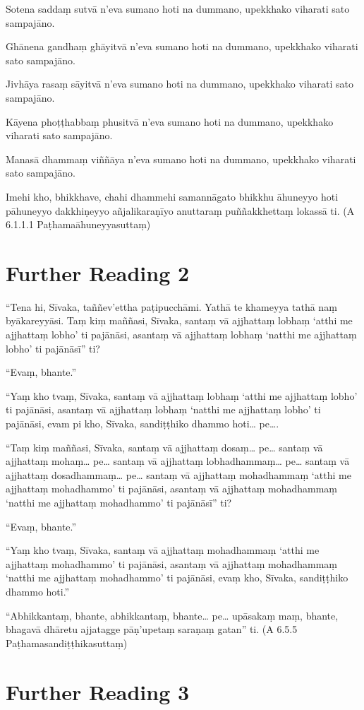 Sotena saddaṃ sutvā n’eva sumano hoti na dummano, upekkhako viharati sato sampajāno.

Ghānena gandhaṃ ghāyitvā n’eva sumano hoti na dummano, upekkhako viharati sato sampajāno.

Jivhāya rasaṃ sāyitvā n’eva sumano hoti na dummano, upekkhako viharati sato sampajāno.

Kāyena phoṭṭhabbaṃ phusitvā n’eva sumano hoti na dummano, upekkhako viharati sato sampajāno.

Manasā dhammaṃ viññāya n’eva sumano hoti na dummano, upekkhako viharati sato sampajāno.

Imehi kho, bhikkhave, chahi dhammehi samannāgato bhikkhu āhuneyyo hoti pāhuneyyo dakkhiṇeyyo añjalikaraṇīyo anuttaraṃ puññakkhettaṃ lokassā ti. (A 6.1.1.1 Paṭhamaāhuneyyasuttaṃ)

\section*{Further Reading 2}

“Tena hi, Sīvaka, taññev’ettha paṭipucchāmi. Yathā te khameyya tathā naṃ byākareyyāsi. Taṃ kiṃ maññasi, Sīvaka, santaṃ vā ajjhattaṃ lobhaṃ ‘atthi me ajjhattaṃ lobho’ ti pajānāsi, asantaṃ vā ajjhattaṃ lobhaṃ ‘natthi me ajjhattaṃ lobho’ ti pajānāsī” ti?

“Evaṃ, bhante.”

“Yaṃ kho tvaṃ, Sīvaka, santaṃ vā ajjhattaṃ lobhaṃ ‘atthi me ajjhattaṃ lobho’ ti pajānāsi, asantaṃ vā ajjhattaṃ lobhaṃ ‘natthi me ajjhattaṃ lobho’ ti pajānāsi, evam pi kho, Sīvaka, sandiṭṭhiko dhammo hoti… pe….

“Taṃ kiṃ maññasi, Sīvaka, santaṃ vā ajjhattaṃ dosaṃ… pe… santaṃ vā ajjhattaṃ mohaṃ… pe… santaṃ vā ajjhattaṃ lobhadhammaṃ… pe… santaṃ vā ajjhattaṃ dosadhammaṃ… pe… santaṃ vā ajjhattaṃ mohadhammaṃ ‘atthi me ajjhattaṃ mohadhammo’ ti pajānāsi, asantaṃ vā ajjhattaṃ mohadhammaṃ ‘natthi me ajjhattaṃ mohadhammo’ ti pajānāsī” ti?

“Evaṃ, bhante.”

“Yaṃ kho tvaṃ, Sīvaka, santaṃ vā ajjhattaṃ mohadhammaṃ ‘atthi me ajjhattaṃ mohadhammo’ ti pajānāsi, asantaṃ vā ajjhattaṃ mohadhammaṃ ‘natthi me ajjhattaṃ mohadhammo’ ti pajānāsi, evaṃ kho, Sīvaka, sandiṭṭhiko dhammo hoti.”

“Abhikkantaṃ, bhante, abhikkantaṃ, bhante… pe… upāsakaṃ maṃ, bhante, bhagavā dhāretu ajjatagge pāṇ’upetaṃ saraṇaṃ gatan” ti. (A 6.5.5 Paṭhamasandiṭṭhikasuttaṃ)

\section*{Further Reading 3}

